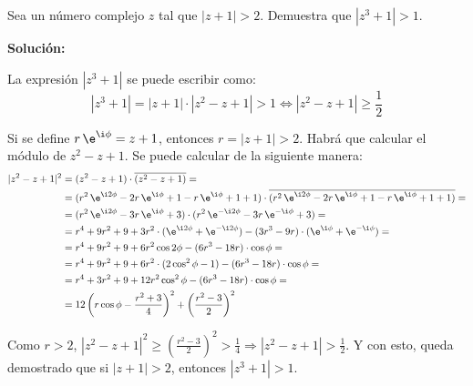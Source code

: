 \documentclass[../../main.tex]{subfiles}
\begin{document}
  \begin{shaded}
    Sea un número complejo $z$ tal que $|z + 1| > 2$. Demuestra que $|z^3 + 1| > 1$.
  \end{shaded}

  \textbf{Solución:}

  La expresión $|z^3 + 1|$ se puede escribir como:
  $$
  |z^3 + 1| = |z + 1| \cdot |z^2 - z + 1| > 1 \iff |z^2 - z + 1| \geq \frac{1}{2}
  $$

  Si se define $r \, \e^{\i\phi} = z + 1$, entonces $r = |z + 1| > 2$. Habrá que calcular el módulo de $z^2 - z + 1$. Se puede calcular de la siguiente manera:
  \begin{equation*}
    \begin{split}
      |z^2 - z + 1|^2 & =
      (z^2 - z + 1) \cdot \overline{(z^2 - z + 1)} = \\ & =
      (r^2 \, \e^{\i2\phi} - 2r \, \e^{\i\phi} + 1 - r \, \e^{\i\phi} + 1 + 1) \cdot \overline{(r^2 \, \e^{\i2\phi} - 2r \, \e^{\i\phi} + 1 - r \, \e^{\i\phi} + 1 + 1)} = \\ & =
      (r^2 \, \e^{\i2\phi} - 3r \, \e^{\i\phi} + 3) \cdot (r^2 \, \e^{-\i2\phi} - 3r \, \e^{-\i\phi} + 3) = \\ & =
      r^4 + 9 r^2 + 9 + 3 r^2 \cdot (\e^{\i 2 \phi} + \e^{-\i 2 \phi}) - (3 r^3 - 9 r) \cdot (\e^{\i \phi} + \e^{-\i \phi}) = \\ & =
      r^4 + 9 r^2 + 9 + 6 r^2 \cos{2 \phi} - (6 r^3 -18 r) \cdot \cos{\phi} = \\ & =
      r^4 + 9 r^2 + 9 + 6 r^2 \cdot (2\cos^2{\phi} - 1) - (6 r^3 -18 r) \cdot \cos{\phi} = \\ & =
      r^4 + 3 r^2 + 9 + 12 r^2 \cos^2{\phi} - (6 r^3 -18 r) \cdot \cos{\phi} = \\ & =
      12 \left(r \cos{\phi} - \frac{r^2 + 3}{4}\right)^2 + \left(\frac{r^2 - 3}{2}\right)^2
    \end{split}
  \end{equation*}

  Como $r > 2$, $|z^2 - z + 1|^2 \geq \left(\displaystyle\frac{r^2 - 3}{2}\right)^2 > \displaystyle\frac{1}{4} \Longrightarrow |z^2 - z + 1| > \displaystyle\frac{1}{2}$. Y con esto, queda demostrado que si $|z + 1| > 2$, entonces $|z^3 + 1| > 1$.
\end{document}
